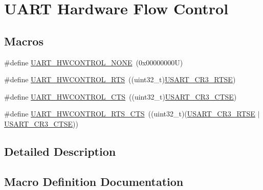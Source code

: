 \hypertarget{group___u_a_r_t___hardware___flow___control}{}\section{U\+A\+RT Hardware Flow Control}
\label{group___u_a_r_t___hardware___flow___control}
\subsection*{Macros}
\begin{DoxyCompactItemize}
\item 
\#define \hyperlink{group___u_a_r_t___hardware___flow___control_gae0569001c06b7760cd38c481f84116cf}{U\+A\+R\+T\+\_\+\+H\+W\+C\+O\+N\+T\+R\+O\+L\+\_\+\+N\+O\+NE}~(0x00000000\+U)
\item 
\#define \hyperlink{group___u_a_r_t___hardware___flow___control_ga6d5dad09c6abf30f252084ba0f8c0b7d}{U\+A\+R\+T\+\_\+\+H\+W\+C\+O\+N\+T\+R\+O\+L\+\_\+\+R\+TS}~((uint32\+\_\+t)\hyperlink{group___peripheral___registers___bits___definition_ga7c5d6fcd84a4728cda578a0339b4cac2}{U\+S\+A\+R\+T\+\_\+\+C\+R3\+\_\+\+R\+T\+SE})
\item 
\#define \hyperlink{group___u_a_r_t___hardware___flow___control_ga352f517245986e3b86bc75f8472c51ea}{U\+A\+R\+T\+\_\+\+H\+W\+C\+O\+N\+T\+R\+O\+L\+\_\+\+C\+TS}~((uint32\+\_\+t)\hyperlink{group___peripheral___registers___bits___definition_gaa125f026b1ca2d76eab48b191baed265}{U\+S\+A\+R\+T\+\_\+\+C\+R3\+\_\+\+C\+T\+SE})
\item 
\#define \hyperlink{group___u_a_r_t___hardware___flow___control_ga7c91698e8f08ba7ed3f2a0ba9aa27d73}{U\+A\+R\+T\+\_\+\+H\+W\+C\+O\+N\+T\+R\+O\+L\+\_\+\+R\+T\+S\+\_\+\+C\+TS}~((uint32\+\_\+t)(\hyperlink{group___peripheral___registers___bits___definition_ga7c5d6fcd84a4728cda578a0339b4cac2}{U\+S\+A\+R\+T\+\_\+\+C\+R3\+\_\+\+R\+T\+SE} $\vert$ \hyperlink{group___peripheral___registers___bits___definition_gaa125f026b1ca2d76eab48b191baed265}{U\+S\+A\+R\+T\+\_\+\+C\+R3\+\_\+\+C\+T\+SE}))
\end{DoxyCompactItemize}


\subsection{Detailed Description}


\subsection{Macro Definition Documentation}
\mbox{\label{group___u_a_r_t___hardware___flow___control_ga352f517245986e3b86bc75f8472c51ea}} 
